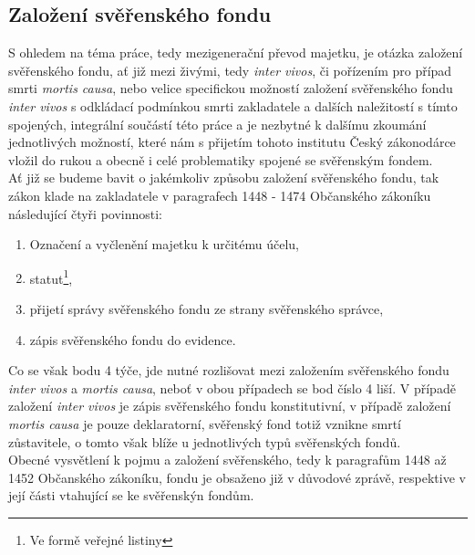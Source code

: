\documentclass{article}
\begin{document}
\newpage
\thispagestyle{smallertextinheader}

\subsection{Založení svěřenského fondu}

S ohledem na téma práce, tedy mezigenerační převod majetku, je otázka založení svěřenského fondu, ať již mezi živými, tedy \textit{inter vivos}, či pořízením pro případ smrti \textit{mortis causa}, nebo velice specifickou možností založení svěřenského fondu \textit{inter vivos} s odkládací podmínkou smrti zakladatele a dalších naležitostí s tímto spojených, integrální součástí této práce a je nezbytné k dalšímu zkoumání jednotlivých možností, které nám s přijetím tohoto institutu Český zákonodárce vložil do rukou a obecně i celé problematiky spojené se svěřenským fondem. \\

Ať již se budeme bavit o jakémkoliv způsobu založení svěřenského fondu, tak zákon klade na zakladatele v paragrafech 1448 - 1474 Občanského zákoníku následující čtyři povinnosti:

\begin{enumerate}
\item Označení a vyčlenění majetku k určitému účelu,
\item statut\footnote{Ve formě veřejné listiny},
\item přijetí správy svěřenského fondu ze strany svěřenského správce,
\item zápis svěřenského fondu do evidence.
\end{enumerate}

Co se však bodu 4 týče, jde nutné rozlišovat mezi založením svěřenského fondu \textit{inter vivos} a \textit{mortis causa}, neboť v obou případech se bod číslo 4 liší. V případě založení \textit{inter vivos} je zápis svěřenského fondu konstitutivní, v případě založení \textit{mortis causa} je pouze deklaratorní, svěřenský fond totiž vznikne smrtí zůstavitele, o tomto však blíže u jednotlivých typů svěřenských fondů.\\

Obecné vysvětlení k pojmu a založení svěřenského, tedy k paragrafům 1448 až 1452 Občanského zákoníku, fondu je obsaženo již v důvodové zprávě, respektive v její části vtahující se ke svěřenskýn fondům.\\
\end{document}
